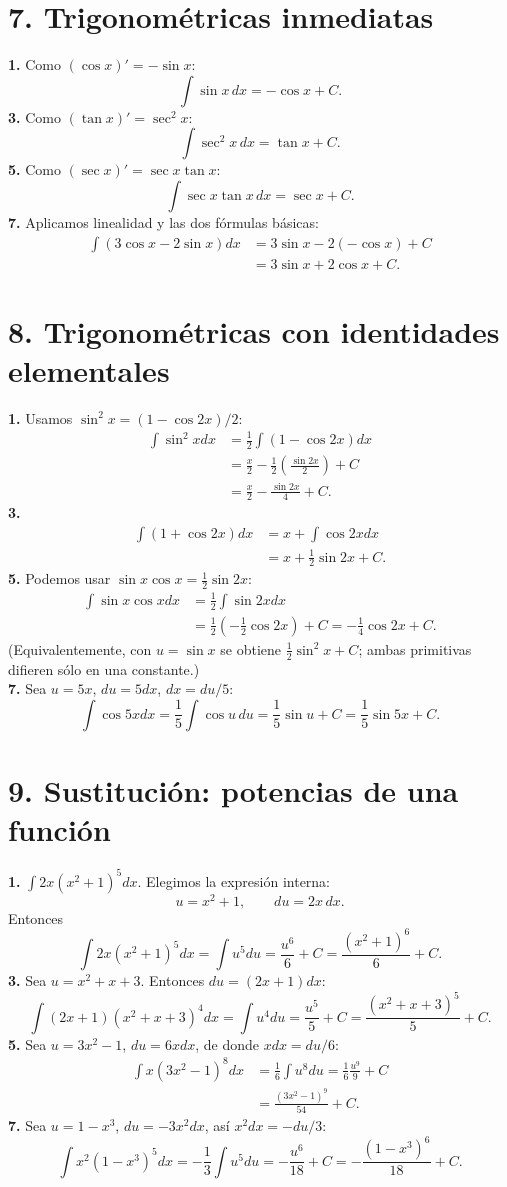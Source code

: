 \documentclass[11pt]{article}
\begin{document}
\section*{7. Trigonométricas inmediatas}
\textbf{1.} Como $(\cos x)'=-\sin x$:
\[\int\sin x\,dx=-\cos x+C.\]
\textbf{3.} Como $(\tan x)'=\sec^2x$:
\[\int\sec^2x\,dx=\tan x+C.\]
\textbf{5.} Como $(\sec x)'=\sec x\tan x$:
\[\int\sec x\tan x\,dx=\sec x+C.\]
\textbf{7.} Aplicamos linealidad y las dos fórmulas básicas:
\begin{align*}\int(3\cos x-2\sin x)dx&=3\sin x-2(-\cos x)+C\\&=3\sin x+2\cos x+C.\end{align*}

\section*{8. Trigonométricas con identidades elementales}
\textbf{1.} Usamos $\sin^2x=(1-\cos2x)/2$:
\begin{align*}\int\sin^2x dx&=\frac12\int(1-\cos2x)dx\\&=\frac{x}{2}-\frac12\left(\frac{\sin2x}{2}\right)+C\\&=\frac{x}{2}-\frac{\sin2x}{4}+C.\end{align*}
\textbf{3.}\begin{align*}\int(1+\cos2x)dx&=x+\int\cos2x dx\\&=x+\frac12\sin2x+C.\end{align*}
\textbf{5.} Podemos usar $\sin x\cos x=\frac12\sin2x$:
\begin{align*}\int\sin x\cos x dx&=\frac12\int\sin2x dx\\&=\frac12\left(-\frac12\cos2x\right)+C=-\frac14\cos2x+C.\end{align*}
(Equivalentemente, con $u=\sin x$ se obtiene $\frac12\sin^2x+C$; ambas primitivas difieren sólo en una constante.)\\
\textbf{7.} Sea $u=5x$, $du=5dx$, $dx=du/5$:
\[\int\cos5x dx=\frac15\int\cos u\,du=\frac15\sin u+C=\frac15\sin5x+C.\]

\section*{9. Sustitución: potencias de una función}
\textbf{1.} $\displaystyle\int2x(x^2+1)^5dx$. Elegimos la expresión interna:
\[u=x^2+1,\qquad du=2x\,dx.\]
Entonces
\[\int2x(x^2+1)^5dx=\int u^5du=\frac{u^6}{6}+C=\frac{(x^2+1)^6}{6}+C.\]
\textbf{3.} Sea $u=x^2+x+3$. Entonces $du=(2x+1)dx$:
\[\int(2x+1)(x^2+x+3)^4dx=\int u^4du=\frac{u^5}{5}+C=\frac{(x^2+x+3)^5}{5}+C.\]
\textbf{5.} Sea $u=3x^2-1$, $du=6x dx$, de donde $x dx=du/6$:
\begin{align*}\int x(3x^2-1)^8dx&=\frac16\int u^8du=\frac16\frac{u^9}{9}+C\\&=\frac{(3x^2-1)^9}{54}+C.\end{align*}
\textbf{7.} Sea $u=1-x^3$, $du=-3x^2dx$, así $x^2dx=-du/3$:
\[\int x^2(1-x^3)^5dx=-\frac13\int u^5du=-\frac{u^6}{18}+C=-\frac{(1-x^3)^6}{18}+C.\]
\end{document}
